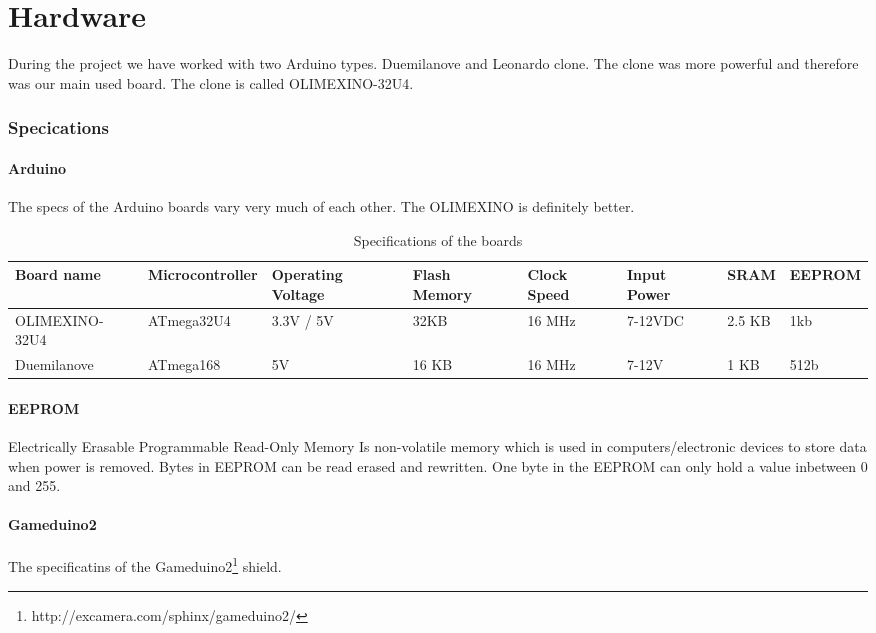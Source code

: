 \chapter{Hardware} %

During the project we have worked with two Arduino types. Duemilanove and Leonardo clone.
The clone was more powerful and therefore was our main used board. The clone is called
OLIMEXINO-32U4.
\subsection{Specications}

\subsubsection{Arduino}
The specs of the Arduino boards vary very much of each other. The OLIMEXINO is definitely
better.

\begin{table}[h]
\resizebox{16cm}{!} {
    \begin{tabular}{l|l|l|l|l|l|l|l}
    Board name     & Microcontroller & Operating Voltage & Flash Memory & Clock Speed & Input Power & SRAM & EEPROM  \\ \hline
    OLIMEXINO-32U4 & ATmega32U4      & 3.3V / 5V         & 32KB         & 16 MHz      & 7-12VDC     & 2.5 KB & 1kb \\
    Duemilanove    & ATmega168       & 5V                & 16 KB        & 16 MHz      & 7-12V       & 1 KB& 512b   \\
    \end{tabular}
}
    \caption{Specifications of the boards}
\end{table}
\subsubsection*{EEPROM}
Electrically Erasable Programmable Read-Only Memory Is non-volatile memory which is used in computers/electronic devices to store data when power is removed. Bytes in EEPROM can be read erased and rewritten. One byte in the EEPROM can only hold a value inbetween 0 and 255.
\subsubsection{Gameduino2}
The specificatins of the Gameduino2\footnote{http://excamera.com/sphinx/gameduino2/} shield.


